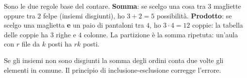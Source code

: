 \begin{spiegazione}
    Sono le due regole base del contare. \textbf{Somma}: se scelgo una cosa tra $3$ magliette oppure tra $2$ felpe (insiemi
    disgiunti), ho $3 + 2 = 5$ possibilità. \textbf{Prodotto}: se scelgo una maglietta \textbf{e} un paio di pantaloni tra $4$, ho
    $3 \cdot 4 = 12$ coppie: la tabella delle coppie ha $3$ righe e $4$ colonne. La partizione è la somma ripetuta: un'aula con
    $r$ file da $k$ posti ha $rk$ posti.
\end{spiegazione}


Se gli insiemi non sono disgiunti la somma degli ordini conta due volte gli elementi in comune. Il principio di
inclusione-esclusione corregge l'errore.

